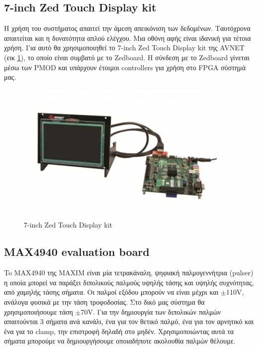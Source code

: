 \documentclass[12pt,a4paper]{book}
\begin{document}
\subsection{7-inch Zed Touch Display kit}
Η χρήση του συστήματος απαιτεί την άμεση απεικόνιση των δεδομένων. Ταυτόχρονα απαιτείται και η δυνατότητα απλού ελέγχου. Μια οθόνη αφής είναι ιδανική για τέτοια χρήση. Για αυτό θα χρησιμοποιηθεί το 7-inch Zed Touch Display kit της AVNET (εικ \ref{zed_touch}), το οποίο είναι συμβατό με το Zedboard. Η σύνδεση με το Zedboard γίνεται μέσω των PMOD και υπάρχουν έτοιμοι controllers για χρήση στο FPGA σύστημά μας.
\begin{figure}
	\centering
	\includegraphics[width=\textwidth]{zed_touch}
	\caption{7-inch Zed Touch Display kit}
	\label{zed_touch}
\end{figure}

\subsection{MAX4940 evaluation board}
To MAX4940 της MAXIM είναι μία τετρακάναλη, ψηφιακή παλμογεννήτρια (pulser) η οποία μπορεί να παράξει διπολικούς παλμούς υψηλής τάσης και υψηλής συχνότητας, από χαμηλής τάσης σήματα. Οι παλμοί εξόδου μπορούν να είναι μέχρι και $ \pm $110V, ανάλογα φυσικά με την τάση τροφοδοσίας. Στο δικό μας σύστημα θα χρησιμοποιήσουμε τάση $ \pm $70V. Για την δημιουργία των διπολικών παλμών απαιτούνται 3 σήματα ανά κανάλι, ένα για τον θετικό παλμό, ένα για τον αρνητικό και ένα για το clamp, την επιστροφή δηλαδή στο μηδέν. Χρησιμοποιώντας αυτά τα σήματα μπορούμε να δημιουργήσουμε οποιαδήποτε ακολουθία παλμών θέλουμε.
\end{document}
